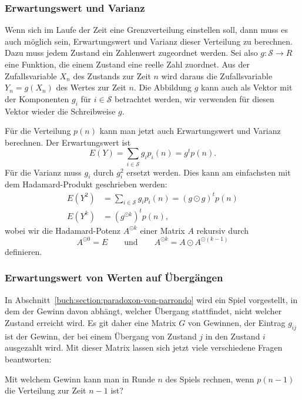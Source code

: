 \subsubsection{Erwartungswert und Varianz}
Wenn sich im Laufe der Zeit eine Grenzverteilung einstellen soll, dann
muss es auch möglich sein, Erwartungswert und Varianz dieser Verteilung
zu berechnen.
Dazu muss jedem Zustand ein Zahlenwert zugeordnet werden.
Sei also
\(
g: \mathcal{S}\to R
\)
eine Funktion, die einem Zustand eine reelle Zahl zuordnet.
Aus der Zufallsvariable $X_n$ des Zustands zur Zeit $n$ wird daraus
die Zufallsvariable $Y_n=g(X_n)$ des Wertes zur Zeit $n$.
Die Abbildung $g$ kann auch als Vektor mit der Komponenten $g_i$ 
für $i\in\mathcal{S}$ betrachtet werden, wir verwenden für diesen
Vektor wieder die Schreibweise $g$.

Für die Verteilung $p(n)$ kann man jetzt auch Erwartungswert und
Varianz berechnen.
Der Erwartungswert ist
\[
E(Y)
=
\sum_{i\in\mathcal{S}} g_i p_i(n)
=
g^t p(n).
\]
Für die Varianz muss $g_i$ durch $g_i^2$ ersetzt werden.
Dies kann am einfachsten mit dem Hadamard-Produkt geschrieben werden:
\begin{align*}
E(Y^2)
&=
\sum_{i\in\mathcal{S}} g_i p_i(n)
=
(g\odot g)^t p(n)
\\
E(Y^k)
&=
(g^{\odot k})^t p(n),
\end{align*}
wobei wir die Hadamard-Potenz $A^{\odot k}$ einer Matrix $A$ rekursiv
durch
\[
A^{\odot 0}=E
\qquad\text{und}\qquad
A^{\odot k} = A\odot A^{\odot (k-1)}
\]
definieren.

\subsubsection{Erwartungswert von Werten auf Übergängen}
In Abschnitt~\ref{buch:section:paradoxon-von-parrondo} wird ein Spiel
vorgestellt, in dem der Gewinn davon abhängt, welcher Übergang stattfindet,
nicht welcher Zustand erreicht wird.
Es git daher eine Matrix $G$ von Gewinnen, der Eintrag $g_{ij}$ ist
der Gewinn, der bei einem Übergang von Zustand $j$ in den Zustand $i$
ausgezahlt wird.
Mit dieser Matrix lassen sich jetzt viele verschiedene Fragen beantworten:

\begin{frage}
\label{buch:wahrscheinlichkeit:frage1}
Mit welchem Gewinn kann man in Runde $n$ des Spiels rechnen,
wenn $p(n-1)$ die Verteilung zur Zeit $n-1$ ist?
\end{frage}

